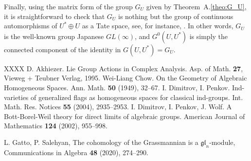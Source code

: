 \documentclass[11pt, a4paper]{article}
\begin{document}
Finally, using the matrix form of the group $G_U$ given by Theorem~A.\ref{theo:G_U}, it is straightforward to check that $G_U$ is nothing but the group   
 of continuous automorphisms of $U^*\oplus U$ as a Tate space, see, for instance, \cite{Kapranov}. In other words, $G_U$ is the well-known group Japanese $GL(\infty)$, and $G^0(U,U^*)$ is simply the connected component of the identity in $G(U,U^*)=G_U$.



\newpage\begin{thebibliography}{XXXX}
 D. Akhiezer. Lie Group Actions in Complex Analysis. Asp. of Math. \textbf{27}, Vieweg + Teubner Verlag, 1995.
 Wei-Liang Chow. On the Geometry of Algebraic Homogeneous Spaces.
Ann. Math. \textbf{50} (1949), 32--67.
 I. Dimitrov, I. Penkov. Ind-varieties of generalized flags as homogeneous spaces for classical ind-groups. Int. Math. Res. Notices \textbf{55} (2004), 2935--2953.
 I. Dimitrov, I. Penkov, J. Wolf. A Bott-Borel-Weil theory for direct limits of algebraic groups. American Journal of Mathematics \textbf{124} (2002), 955--998.

 L. Gatto, P. Salehyan, The cohomology of the Grassmannian is a $\mathfrak{gl}_n$-module, Communications in Algebra \textbf{48}  (2020), 274--290.


\end{thebibliography}
\end{document}
